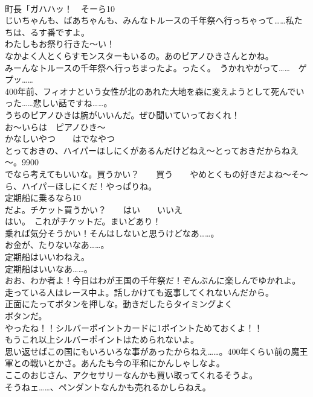 \documentclass[8pt]{extreport}
\begin{document}
\begin{CJK}{UTF8}{min}
\\	町長「ガハハッ！　そーら10
\\	じいちゃんも、ばあちゃんも、みんなトルースの千年祭へ行っちゃって……私たちは、るす番ですよ。	
\\	わたしもお祭り行きた～い！	
\\	なかよく人とくらすモンスターもいるの。あのピアノひきさんとかね。	
\\	みーんなトルースの千年祭へ行っちまったよ。ったく。　うかれやがって……　ゲプッ……	
\\	400年前、フィオナという女性が北のあれた大地を森に変えようとして死んでいった……悲しい話ですね……。	
\\	うちのピアノひきは腕がいいんだ。ぜひ聞いていっておくれ！	
\\	お～いらは　ピアノひき～
\\	かなしいやつ　　はでなやつ	
\\	とっておきの、ハイパーほしにくがあるんだけどねえ～とっておきだからねえ～。9900
\\	でなら考えてもいいな。買うかい？　　買う　　やめとくもの好きだよね～そ～ら、ハイパーほしにくだ！やっぱりね。	
\\	定期船に乗るなら10
\\	だよ。チケット買うかい？　　はい　　いいえ	
\\	はい。　これがチケットだ。まいどあり！	
\\	乗れば気分そうかい！そんはしないと思うけどなあ……。	
\\	お金が、たりないなあ……。	
\\	定期船はいいわねえ。	
\\	定期船はいいなあ……。	
\\	おお、わか者よ！今日はわが王国の千年祭だ！ぞんぶんに楽しんでゆかれよ。	
\\	走っている人はレース中よ。話しかけても返事してくれないんだから。	
\\	正面にたってボタンを押しな。動きだしたらタイミングよく
\\	ボタンだ。	
\\	やったね！！シルバーポイントカードに1ポイントためておくよ！！	
\\	もうこれ以上シルバーポイントはためられないよ。	
\\	思い返せばこの国にもいろいろな事があったからねえ……。400年くらい前の魔王軍との戦いとかさ。あんたも今の平和にかんしゃしなよ。	
\\	ここのおじさん、アクセサリーなんかも買い取ってくれるそうよ。	
\\	そうねェ……、ペンダントなんかも売れるかしらねえ。	

\end{CJK}
\end{document}
